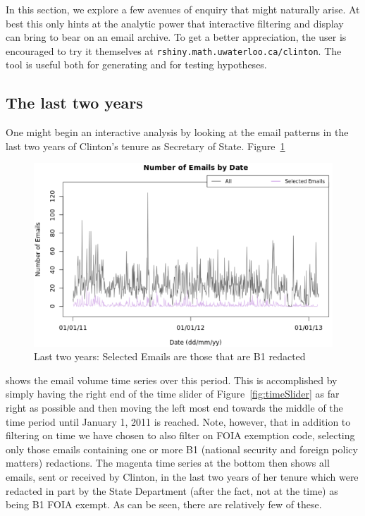 \documentclass[journal]{vgtc}                %
\begin{document}
In this section, we explore a few avenues of enquiry that might naturally arise.  At best this only hints at the analytic power that interactive filtering and display can bring to bear on an email archive.  To get a better appreciation, the user is encouraged to try it themselves at \texttt{rshiny.math.uwaterloo.ca/clinton}.  The tool is useful both for generating and for testing hypotheses.

\subsection{The last two years}
One might begin an interactive analysis by looking at the email patterns in the last two years of Clinton's tenure as Secretary of State.  
Figure~\ref{fig:lastTwoYears} 
\begin{figure}[h]
\begin{center}
\includegraphics[width=0.95\linewidth]{EmailVolumeB1LastTwoYears}
\caption{Last two years:  Selected Emails are those that are B1 redacted}
\label{fig:lastTwoYears}
\end{center}
\end{figure}
shows the email volume time series over this period. 
This is accomplished by simply having the right end of the time slider of Figure~\ref{fig:timeSlider} as far right as possible and then moving the left most end towards the middle of the time period until January 1, 2011 is reached.   Note, however, that in addition to filtering on time we have chosen to also filter on FOIA exemption code, selecting only those emails containing one or more B1 (national security and foreign policy matters) redactions.  The magenta time series at the bottom then shows all emails, sent or received by Clinton, in the last two years of her tenure which were redacted in part by the State Department (after the fact, not at the time) as being B1 FOIA exempt.  As can be seen, there are relatively few of these.
\end{document}
